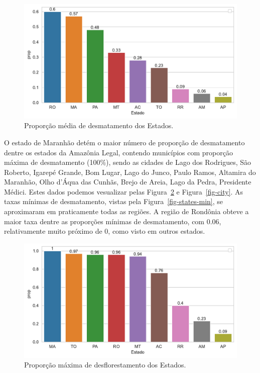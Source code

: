 \documentclass[
]{article}
\begin{document}
\begin{figure}[H]

{\centering \includegraphics{report_files/figure-pdf/fig-states-mean-output-1.pdf}

}

\caption{\label{fig-states-mean}Proporção média de desmatamento dos
Estados.}

\end{figure}

O estado de Maranhão detém o maior número de proporção de desmatamento
dentre os estados da Amazônia Legal, contendo municípios com proporção
máxima de desmatamento (100\%), sendo as cidades de Lago dos Rodrigues,
São Roberto, Igarepé Grande, Bom Lugar, Lago do Junco, Paulo Ramos,
Altamira do Maranhão, Olho d'Áqua das Cunhãs, Brejo de Areia, Lago da
Pedra, Presidente Médici. Estes dados podemos vesualizar pelas
Figura~\ref{fig-states-max} e Figura~\ref{fig-city}. As taxas mínimas de
desmatamento, vistas pela Figura~\ref{fig-states-min}, se aproximaram em
praticamente todas as regiões. A região de Rondônia obteve a maior taxa
dentre as proporções mínimas de desmatamento, com 0.06, relativamente
muito próximo de 0, como visto em outros estados.

\begin{figure}[H]

{\centering \includegraphics{report_files/figure-pdf/fig-states-max-output-1.pdf}

}

\caption{\label{fig-states-max}Proporção máxima de desflorestamento dos
Estados.}

\end{figure}
\end{document}
